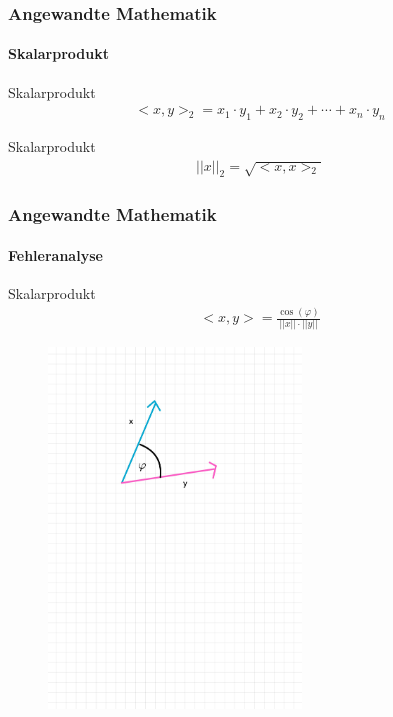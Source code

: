 \documentclass{beamer}
\begin{document}
\begin{frame}
    \frametitle{Angewandte Mathematik}
\framesubtitle{Skalarprodukt}
 \begin{block}{Skalarprodukt}
\begin{align*}
<x,y>_2 = x_1 \cdot y_1 + x_2 \cdot y_2 + \cdots + x_n \cdot y_n 
\end{align*}
\end{block}

 \begin{block}{Skalarprodukt}
\begin{align*}
||x||_2 = \sqrt{<x,x>_2} 
\end{align*}
\end{block}

 \end{frame}


\begin{frame}
    \frametitle{Angewandte Mathematik}
\framesubtitle{Fehleranalyse}
    \begin{block}{Skalarprodukt}
\begin{align*}
<x,y> = \frac{\cos(\varphi)}{||x|| \cdot ||y||}
\end{align*}
\end{block}
\begin{figure}[H]
      \centering
    \includegraphics[width=0.6\textwidth]{images/angle}
\end{figure}
 \end{frame}
\end{document}
